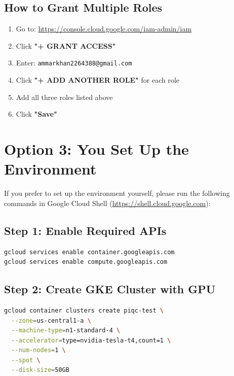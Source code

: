 \documentclass[11pt,a4paper]{article}
\begin{document}
\subsection{How to Grant Multiple Roles}

\begin{enumerate}
    \item Go to: \url{https://console.cloud.google.com/iam-admin/iam}
    \item Click \textbf{"+ GRANT ACCESS"}
    \item Enter: \texttt{ammarkhan2264388@gmail.com}
    \item Click \textbf{"+ ADD ANOTHER ROLE"} for each role
    \item Add all three roles listed above
    \item Click \textbf{"Save"}
\end{enumerate}

\section{Option 3: You Set Up the Environment}

If you prefer to set up the environment yourself, please run the following commands in Google Cloud Shell (\url{https://shell.cloud.google.com}):

\subsection{Step 1: Enable Required APIs}

\begin{lstlisting}[language=bash]
gcloud services enable container.googleapis.com
gcloud services enable compute.googleapis.com
\end{lstlisting}

\subsection{Step 2: Create GKE Cluster with GPU}

\begin{lstlisting}[language=bash]
gcloud container clusters create piqc-test \
  --zone=us-central1-a \
  --machine-type=n1-standard-4 \
  --accelerator=type=nvidia-tesla-t4,count=1 \
  --num-nodes=1 \
  --spot \
  --disk-size=50GB
\end{lstlisting}
\end{document}
